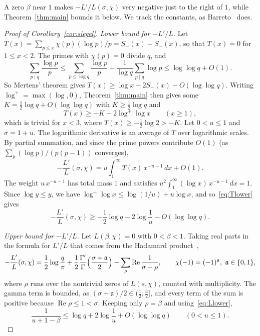 \documentclass[11pt]{amsart}
\theoremstyle{remark}
\begin{document}
A zero $\beta$ near $1$ makes $-L'/L(\sigma,\chi)$ very negative just to the right of $1$, while
Theorem~\ref{thm:main} bounds it below. We track the constants, as Barreto~\cite{Barreto} does.

\begin{proof}[Proof of Corollary~\ref{cor:siegel}]
\emph{Lower bound for $-L'/L$.} Let $T(x)=\sum_{p\le x}\chi(p)(\log p)/p=S_+(x)-S_-(x)$, so that $T(x)=0$ for
$1\le x<2$. The primes with $\chi(p)=0$ divide $q$, and
\[
\sum_{p\mid q}\frac{\log p}p\le\sum_{p\le\log q}\frac{\log p}p+\frac1{\log q}\sum_{p\mid q}\log p
\le\log\log q+O(1).
\]
So Mertens' theorem gives $T(x)\ge\log x-2S_-(x)-O(\log\log q)$. Writing $\log^+=\max(\log,0)$,
Theorem~\ref{thm:main} then gives some $K=\frac12\log q+O(\log\log q)$ with $K\ge\frac12\log q$ and
\begin{equation}\label{eq:Tlower}
T(x)\ge-K-2\log^+\log x\qquad(x\ge1),
\end{equation}
which is trivial for $x<3$, where $T(x)\ge-\frac12\log2>-K$. Let $0<u\le1$ and $\sigma=1+u$. The
logarithmic derivative is an average of $T$ over logarithmic scales. By partial summation, and since
the prime powers contribute $O(1)$ (as $\sum_p(\log p)/(p(p-1))$ converges),
\[
-\frac{L'}{L}(\sigma,\chi)=u\int_1^\infty T(x)\,x^{-u-1}\,dx+O(1).
\]
The weight $u\,x^{-u-1}$ has total mass $1$ and satisfies $u^2\int_1^\infty(\log x)\,x^{-u-1}\,dx=1$.
Since $\log y\le y$, we have $\log^+\log x\le\log(1/u)+u\log x$, and so~\eqref{eq:Tlower} gives
\begin{equation}\label{eq:Llower}
-\frac{L'}{L}(\sigma,\chi)\ge-\frac12\log q-2\log\frac1u-O(\log\log q).
\end{equation}

\emph{Upper bound for $-L'/L$.} Let $L(\beta,\chi)=0$ with $0<\beta<1$. Taking real parts in the formula for
$L'/L$ that comes from the Hadamard
product~\cite[Ch.~12, (17)--(18), and Ch.~14, p.~89, (2)]{Davenport},
\[
-\frac{L'}{L}(\sigma,\chi)=\frac12\log\frac q\pi
+\frac12\frac{\Gamma'}{\Gamma}\Bigl(\frac{\sigma+\mathfrak a}2\Bigr)
-\sum_\rho\operatorname{Re}\frac1{\sigma-\rho},\qquad \chi(-1)=(-1)^{\mathfrak a},\ \mathfrak a\in\{0,1\},
\]
where $\rho$ runs over the nontrivial zeros of $L(s,\chi)$, counted with multiplicity. The gamma
term is bounded, as $(\sigma+\mathfrak a)/2\in(\frac12,\frac32]$, and every term of the sum is
positive because $\operatorname{Re}\rho\le1<\sigma$. Keeping only $\rho=\beta$ and using~\eqref{eq:Llower},
\begin{equation}\label{eq:key}
\frac1{u+1-\beta}\le\log q+2\log\frac1u+O(\log\log q)\qquad(0<u\le1).
\end{equation}


\end{proof}
\end{document}
